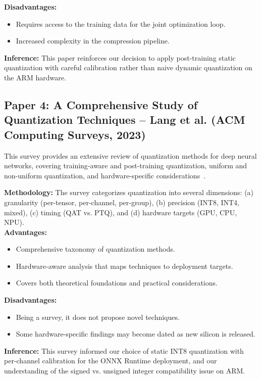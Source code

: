 \documentclass[11pt]{report}
\begin{document}
\textbf{Disadvantages:}
\begin{itemize}
    \item Requires access to the training data for the joint optimization loop.
    \item Increased complexity in the compression pipeline.
\end{itemize}

\textbf{Inference:}
This paper reinforces our decision to apply post-training static quantization with careful calibration rather than naive dynamic quantization on the ARM hardware.

\subsection{Paper 4: A Comprehensive Study of Quantization Techniques -- Lang et al. (ACM Computing Surveys, 2023)}
This survey provides an extensive review of quantization methods for deep neural networks, covering training-aware and post-training quantization, uniform and non-uniform quantization, and hardware-specific considerations~\cite{lang2023}. \par

\textbf{Methodology:} The survey categorizes quantization into several dimensions: (a) granularity (per-tensor, per-channel, per-group), (b) precision (INT8, INT4, mixed), (c) timing (QAT vs. PTQ), and (d) hardware targets (GPU, CPU, NPU). \\

\textbf{Advantages:}
\begin{itemize}
    \item Comprehensive taxonomy of quantization methods.
    \item Hardware-aware analysis that maps techniques to deployment targets.
    \item Covers both theoretical foundations and practical considerations.
\end{itemize}

\textbf{Disadvantages:}
\begin{itemize}
    \item Being a survey, it does not propose novel techniques.
    \item Some hardware-specific findings may become dated as new silicon is released.
\end{itemize}

\textbf{Inference:}
This survey informed our choice of static INT8 quantization with per-channel calibration for the ONNX Runtime deployment, and our understanding of the signed vs. unsigned integer compatibility issue on ARM.
\end{document}
